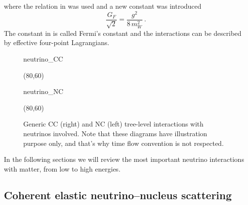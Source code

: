where the relation in  was used and a new constant was introduced 
\begin{equation}
	\label{eq:fermi_const}
	\frac{G_F}{\sqrt{2}} = \frac{g^2}{8\,m_W^2}\ .
\end{equation}
The constant in  is called Fermi's constant and the interactions %
can be described by effective four-point Lagrangians.
						    
\begin{figure}
	\centering
	\medskip
	\begin{fmffile}{neutrino_CC}
		\begin{fmfgraph*}(80,60)
		\end{fmfgraph*}
	\end{fmffile}
	\qquad
	\raisebox{2.5em}{,}
	\qquad
	\begin{fmffile}{neutrino_NC}
		\begin{fmfgraph*}(80,60)
		\end{fmfgraph*}
	\end{fmffile}
	\bigskip
	\caption{Generic CC (right) and NC (left) tree-level interactions with neutrinos involved.
		Note that these diagrams have illustration purpose only, and that's why time flow convention is not respected. }
	\label{fig:neutrino_tree}
\end{figure}

In the following sections we will review the most important neutrino interactions with matter, %
from low to high energies.

\subsection{Coherent elastic neutrino--nucleus scattering}
\label{sec:cevns}

